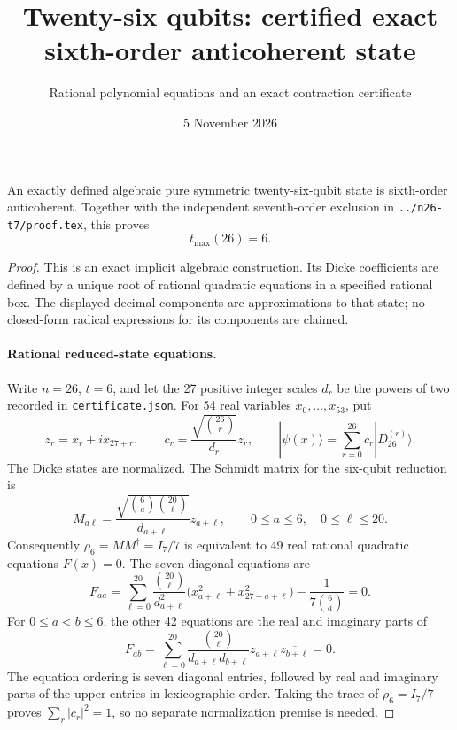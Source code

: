\documentclass[11pt]{article}
\begin{document}
\title{Twenty-six qubits: certified exact sixth-order anticoherent state}
\author{Rational polynomial equations and an exact contraction certificate}
\date{5 November 2026}\maketitle
\begin{theorem}
An exactly defined algebraic pure symmetric twenty-six-qubit state is sixth-order
anticoherent. Together with the independent seventh-order exclusion in
\texttt{../n26-t7/proof.tex}, this proves
\[\boxed{t_{\max}(26)=6.}\]
\end{theorem}
\begin{proof}
This is an exact implicit algebraic construction. Its Dicke coefficients are
defined by a unique root of rational quadratic equations in a specified rational
box. The displayed decimal components are approximations to that state; no
closed-form radical expressions for its components are claimed.

\paragraph{Rational reduced-state equations.}
Write $n=26$, $t=6$, and let the 27 positive integer scales $d_r$ be the powers
of two recorded in \texttt{certificate.json}. For 54 real variables $x_0,\ldots,x_{53}$,
put
\[
z_r=x_r+ix_{27+r},\qquad
c_r=\frac{\sqrt{\binom{26}{r}}}{d_r}z_r,\qquad
|\psi(x)\rangle=\sum_{r=0}^{26}c_r|D_{26}^{(r)}\rangle.
\]
The Dicke states are normalized. The Schmidt matrix for the six-qubit reduction is
\[
M_{a\ell}=\frac{\sqrt{\binom6a\binom{20}\ell}}{d_{a+\ell}}z_{a+\ell},
\qquad0\le a\le6,\quad0\le\ell\le20.
\]
Consequently $\rho_6=MM^\dagger=I_7/7$ is equivalent to 49 real rational
quadratic equations $F(x)=0$. The seven diagonal equations are
\[
F_{aa}=\sum_{\ell=0}^{20}\frac{\binom{20}\ell}{d_{a+\ell}^2}
\bigl(x_{a+\ell}^2+x_{27+a+\ell}^2\bigr)
-\frac1{7\binom6a}=0.
\]
For $0\le a<b\le6$, the other 42 equations are the real and imaginary parts of
\[
F_{ab}=\sum_{\ell=0}^{20}\frac{\binom{20}\ell}{d_{a+\ell}d_{b+\ell}}
z_{a+\ell}\overline{z_{b+\ell}}=0.
\]
The equation ordering is seven diagonal entries, followed by real and imaginary
parts of the upper entries in lexicographic order. Taking the trace of
$\rho_6=I_7/7$ proves $\sum_r|c_r|^2=1$, so no separate normalization premise is needed.


\end{proof}
\end{document}
